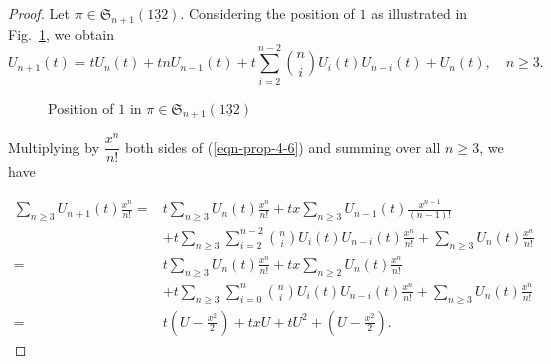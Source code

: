 \documentclass[11pt,reqno]{amsart}
\numberwithin{equation}{section}
\theoremstyle{plain}
\theoremstyle{definition}
\renewcommand{\S}{\mathfrak{S}}
\begin{document}
\begin{proof}
    Let $\pi \in \S_{n+1}(\underline{132})$. Considering the position of $1$ as illustrated in Fig.~\ref{fig:position of 1}, we obtain
    \begin{equation}\label{eqn-prop-4-6}U_{n+1}(t)=tU_n(t)+tnU_{n-1}(t)+t\sum_{i=2}^{n-2}\binom{n}{i}U_i(t)U_{n-i}(t)+U_{n}(t),\quad n \ge 3.\end{equation}

    \begin{figure}[ht]
        \centering



        \caption{Position of $1$ in $\pi \in \S_{n+1}(\underline{132})$}\label{fig:position of 1}
    \end{figure}
Multiplying by $\dfrac{x^n}{n!}$ both sides of (\ref{eqn-prop-4-6}) and summing over all $n\geq 3$, we have    

\begin{align*}
    \sum_{n\ge 3}U_{n+1}(t)\frac{x^n}{n!}={}&t\sum_{n\ge 3}U_n(t)\frac{x^n}{n!}+tx\sum_{n\ge 3}U_{n-1}(t)\frac{x^{n-1}}{(n-1)!} \\
    &+t\sum_{n\ge 3}\sum_{i=2}^{n-2}\binom{n}{i}U_i(t)U_{n-i}(t)\frac{x^n}{n!}+\sum_{n\ge 3}U_n(t)\frac{x^n}{n!} \\
    ={}& t\sum_{n\ge 3}U_n(t)\frac{x^n}{n!}+tx\sum_{n\ge 2}U_{n}(t)\frac{x^{n}}{n!} \\
    &+t\sum_{n\ge 3}\sum_{i=0}^{n}\binom{n}{i}U_i(t)U_{n-i}(t)\frac{x^n}{n!}+\sum_{n\ge 3}U_n(t)\frac{x^n}{n!} \\
    ={}& t\left(U-\frac{x^2}{2}\right)+txU+tU^2+\left(U-\frac{x^2}{2}\right).
\end{align*}


\end{proof}
\end{document}
